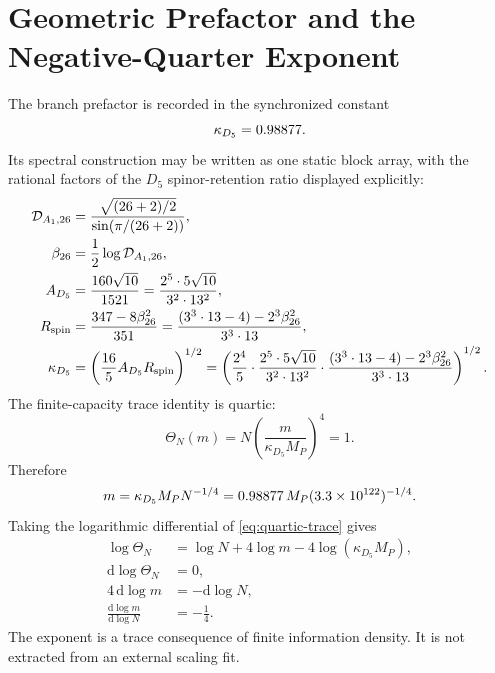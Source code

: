 \documentclass[11pt]{article}
\newcommand{\dd}{\mathrm{d}}
\begin{document}
\section{Geometric Prefactor and the Negative-Quarter Exponent}

The branch prefactor is recorded in the synchronized constant
\begin{equation}
  \kappa_{D_5}=0.98877.
  \label{eq:simplex-prefactor}
\end{equation}
Its spectral construction may be written as one static block array, with the rational factors of the \(D_5\) spinor-retention ratio displayed explicitly:
\begin{equation}
\begin{aligned}
  \mathcal{D}_{A_1,26}
    &=\frac{\sqrt{(26+2)/2}}
            {\sin\!\left(\pi/(26+2)\right)},\\
  \beta_{26}
    &=\frac{1}{2}\log\mathcal{D}_{A_1,26},\\
  A_{D_5}
    &=\frac{160\sqrt{10}}{1521}
     =\frac{2^{5}\cdot5\sqrt{10}}{3^{2}\cdot13^{2}},\\
  R_{\mathrm{spin}}
    &=\frac{347-8\beta_{26}^{2}}{351}
     =\frac{(3^{3}\cdot13-4)-2^{3}\beta_{26}^{2}}{3^{3}\cdot13},\\
  \kappa_{D_5}
    &=\left(\frac{16}{5}A_{D_5}R_{\mathrm{spin}}\right)^{1/2}
     =\left(
        \frac{2^{4}}{5}\cdot
        \frac{2^{5}\cdot5\sqrt{10}}{3^{2}\cdot13^{2}}\cdot
        \frac{(3^{3}\cdot13-4)-2^{3}\beta_{26}^{2}}{3^{3}\cdot13}
       \right)^{1/2}.
\end{aligned}
\label{eq:kappa-construction}
\end{equation}
The finite-capacity trace identity is quartic:
\begin{equation}
\boxed{
  \Theta_N(m)=N\left(\frac{m}{\kappa_{D_5}M_P}\right)^4=1.
}
\label{eq:quartic-trace}
\end{equation}
Therefore
\begin{equation}
  m=\kappa_{D_5}M_PN^{-1/4}
  =0.98877\,M_P(3.3\times10^{122})^{-1/4}.
  \label{eq:mass-gap}
\end{equation}
Taking the logarithmic differential of \eqref{eq:quartic-trace} gives
\begin{equation}
\begin{aligned}
  \log\Theta_N &= \log N+4\log m-4\log(\kappa_{D_5}M_P),\\
  \dd\log\Theta_N&=0,\\
  4\,\dd\log m&=-\dd\log N,\\
  \frac{\dd\log m}{\dd\log N}&=-\frac{1}{4}.
\end{aligned}
\label{eq:negative-quarter}
\end{equation}
The exponent is a trace consequence of finite information density.  It is not extracted from an external scaling fit.
\end{document}
